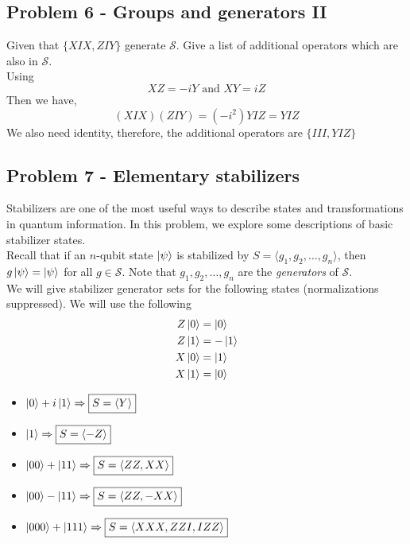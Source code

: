 \newpage
\subsection{Problem 6 - Groups and generators II}
Given that $\{XIX,ZIY\}$ generate $\mathcal{S}$. Give a list of additional operators which are also in $\mathcal{S}$. \\
Using 
\begin{equation}
    XZ = -iY \text{ and } XY = iZ
\end{equation}
Then we have, 
\begin{equation}
    (XIX)(ZIY) = (-i^2)YIZ = YIZ
\end{equation}
We also need identity, therefore, the additional operators are $\{III,YIZ\}$



\newpage
\subsection{Problem 7 - Elementary stabilizers}
Stabilizers are one of the most useful ways to describe states and transformations in quantum information. In this problem, we explore some descriptions of basic stabilizer states. \\

Recall that if an $n$-qubit state $\ket{\psi}$ is stabilized by $S = \langle g_1, g_2, \ldots, g_n\rangle$, then $g\ket{\psi} = \ket{\psi}$ for all $g \in \mathcal{S}$. Note that $g_1, g_2, \ldots, g_n$ are the \textit{generators} of $\mathcal{S}$. \\

We will give stabilizer generator sets for the following states (normalizations suppressed). 
We will use the following
\begin{align}
    Z\ket{0} &= \ket{0}\\
    Z\ket{1} &= -\ket{1}\\
    X\ket{0} &= \ket{1}\\
    X\ket{1} &= \ket{0}
\end{align}

\begin{itemize}
    \item $\ket{0} + i\ket{1} \Rightarrow \boxed{S = \langle Y\rangle}$ 
    \item $\ket{1} \Rightarrow \boxed{S = \langle -Z \rangle}$
    \item $\ket{00} + \ket{11} \Rightarrow \boxed{S = \langle ZZ, XX\rangle}$
    \item $\ket{00} - \ket{11} \Rightarrow \boxed{S = \langle ZZ, -XX\rangle}$
    \item $\ket{000} + \ket{111} \Rightarrow \boxed{S = \langle XXX, ZZI, IZZ\rangle}$
\end{itemize}



